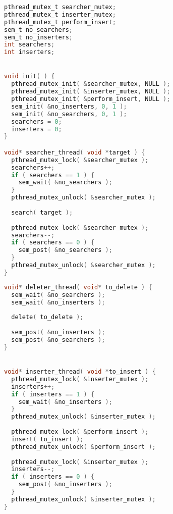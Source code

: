 {\scriptsize
\begin{multicols}{2}

\begin{lstlisting}[language=C]
pthread_mutex_t searcher_mutex;
pthread_mutex_t inserter_mutex;
pthread_mutex_t perform_insert;
sem_t no_searchers;
sem_t no_inserters;
int searchers;
int inserters;


void init( ) {
  pthread_mutex_init( &searcher_mutex, NULL );
  pthread_mutex_init( &inserter_mutex, NULL );
  pthread_mutex_init( &perform_insert, NULL );
  sem_init( &no_inserters, 0, 1 );
  sem_init( &no_searchers, 0, 1 );
  searchers = 0;
  inserters = 0;
}

void* searcher_thread( void *target ) {
  pthread_mutex_lock( &searcher_mutex );
  searchers++;
  if ( searchers == 1 ) {
    sem_wait( &no_searchers );
  }
  pthread_mutex_unlock( &searcher_mutex );
  
  search( target );
  
  pthread_mutex_lock( &searcher_mutex );
  searchers--;
  if ( searchers == 0 ) {
    sem_post( &no_searchers );
  }
  pthread_mutex_unlock( &searcher_mutex );
}
\end{lstlisting}
\columnbreak
\begin{lstlisting}[language=C]
void* deleter_thread( void* to_delete ) {
  sem_wait( &no_searchers );
  sem_wait( &no_inserters );
  
  delete( to_delete );
  
  sem_post( &no_inserters );
  sem_post( &no_searchers );
}


void* inserter_thread( void *to_insert ) {
  pthread_mutex_lock( &inserter_mutex );
  inserters++;
  if ( inserters == 1 ) {
    sem_wait( &no_inserters );
  }
  pthread_mutex_unlock( &inserter_mutex );
  
  pthread_mutex_lock( &perform_insert );
  insert( to_insert );
  pthread_mutex_unlock( &perform_insert );
  
  pthread_mutex_lock( &inserter_mutex );
  inserters--;
  if ( inserters == 0 ) {
    sem_post( &no_inserters );
  }
  pthread_mutex_unlock( &inserter_mutex );
}
\end{lstlisting}
\end{multicols}
}






